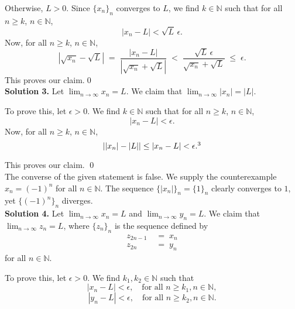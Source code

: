 \documentclass[10pt]{article}
\begin{document}
        Otherwise, $L > 0$.
        Since $\{x_n\}_n$ converges to $L$, we find $k \in \mathbb{N}$ such that for all $n \ge k$, $n \in \mathbb{N}$,
        \[
                |x_n - L| < \sqrt{L}\,\epsilon.
        \]
        Now, for all $n \ge k$, $n \in \mathbb{N}$,
        \[
                |\sqrt{x_n} - \sqrt{L}| \;=\; \frac{|x_n - L|}{|\sqrt{x_n} + \sqrt{L}|} \;<\;
                        \frac{\sqrt{L}\,\epsilon}{\sqrt{x_n} + \sqrt{L}} \;\le\; \epsilon.
        \]
        This proves our claim.\qed\\

        \textbf{Solution 3.}
        Let $\lim_{n\to\infty} x_n = L$. We claim that $\lim_{n\to\infty} |x_n| = |L|$.

        To prove this, let $\epsilon > 0$. We find $k \in \mathbb{N}$ such that for all $n \ge k$, $n \in \mathbb{N}$,
        \[
                |x_n - L| < \epsilon.
        \]
        Now, for all $n \ge k$, $n \in \mathbb{N}$,
        \[
                | |x_n| - |L| | \le |x_n - L| < \epsilon.\footnotemark[3]
        \]
        
        This proves our claim. \qed\\

        The converse of the given statement is false. We supply the counterexample $x_n = (-1)^n$ for all $n \in \mathbb{N}$.
        The sequence $\{|x_n|\}_n = \{1\}_n$ clearly converges to $1$, yet $\{(-1)^n\}_n$ diverges.\\
        
        \clearpage
        \textbf{Solution 4.}
        Let $\lim_{n\to\infty} x_n = L$ and $\lim_{n\to\infty} y_n = L$. We claim that $\lim_{n\to\infty} z_n = L$, where $\{z_n\}_n$
        is the sequence defined by
        \begin{align*}
                z_{2n - 1} \;&=\; x_n \\
                z_{2n} \;&=\; y_n
        \end{align*}
        for all $n \in \mathbb{N}$.

        To prove this, let $\epsilon > 0$. We find $k_1, k_2 \in \mathbb{N}$ such that
        \[|x_n - L| < \epsilon, \quad\text{for all } n \ge k_1, n \in \mathbb{N},\]
        \[|y_n - L| < \epsilon, \quad\text{for all } n \ge k_2, n \in \mathbb{N}.\]
        
\end{document}
